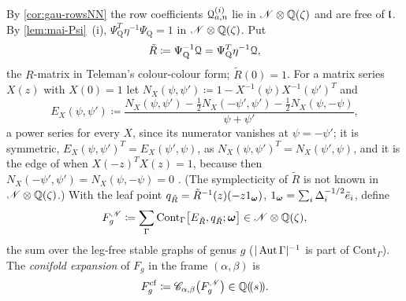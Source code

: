 \begin{defn}
\label{def:mai-Fcf}
By \cref{cor:gau-rowsNN} the row coefficients $\mathcal{Q}^{(i)}_{a,n}$ lie in $\mathscr{N}\otimes\mathbb{Q}(\zeta)$ and are free of $\mathfrak{l}$. By \cref{lem:mai-Psi}~(i), $\Psi_{\mathrm Q}^T\eta^{-1}\Psi_{\mathrm Q}=1$ in $\mathscr{N}\otimes\mathbb{Q}(\zeta)$. Put
\[
\tilde R\coloneqq\Psi_{\mathrm Q}^{-1}\mathcal{Q}=\Psi_{\mathrm Q}^T\eta^{-1}\mathcal{Q} ,
\]
the $R$-matrix in Teleman's colour-colour form; $\tilde R(0)=1$. For a matrix series $X(z)$ with $X(0)=1$ let $N_X(\psi,\psi')\coloneqq1-X^{-1}(\psi)X^{-1}(\psi')^T$ and
\[
E_X(\psi,\psi')\coloneqq\frac{N_X(\psi,\psi')-\frac12N_X(-\psi',\psi')-\frac12N_X(\psi,-\psi)}{\psi+\psi'} ,
\]
a power series for every $X$, since its numerator vanishes at $\psi=-\psi'$; it is symmetric, $E_X(\psi,\psi')^T=E_X(\psi',\psi)$, as $N_X(\psi,\psi')^T=N_X(\psi',\psi)$, and it is the edge of \cite[Def.~2.2]{PPZ15} when $X(-z)^TX(z)=1$, because then $N_X(-\psi',\psi')=N_X(\psi,-\psi)=0$ \cite[Rem.~2.1, (6)]{PPZ15}. (The symplecticity of $\tilde R$ is not known in $\mathscr{N}\otimes\mathbb{Q}(\zeta)$.) With the leaf point $q_{\tilde R}=\tilde R^{-1}(z)(-z1_{\boldsymbol{\omega}})$, $1_{\boldsymbol{\omega}}=\sum_i\Delta_i^{-1/2}\tilde e_i$, define
\[
F_g^{\mathscr{N}}\coloneqq\sum_\Gamma\mathrm{Cont}_\Gamma\bigl[E_{\tilde R},q_{\tilde R};\boldsymbol{\omega}\bigr]\in\mathscr{N}\otimes\mathbb{Q}(\zeta),
\]
the sum over the leg-free stable graphs of genus $g$ ($|\operatorname{Aut}\Gamma|^{-1}$ is part of $\mathrm{Cont}_\Gamma$). The \emph{conifold expansion} of $F_g$ in the frame $(\alpha,\beta)$ is
\[
F_g^{\mathrm{cf}}\coloneqq\mathscr{C}_{\alpha,\beta}\bigl(F_g^{\mathscr{N}}\bigr)\in\mathbb{Q}(\!(s)\!).
\]
\end{defn}

